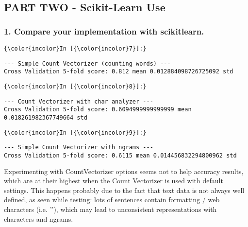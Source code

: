 \documentclass[11pt]{article}
\begin{document}
    \subsection{PART TWO - Scikit-Learn
Use}\label{part-two---scikit-learn-use}

\subsubsection{1. Compare your implementation with
scikitlearn.}\label{compare-your-implementation-with-scikitlearn.}

    \begin{Verbatim}[commandchars=\\\{\}]
{\color{incolor}In [{\color{incolor}7}]:} 
\end{Verbatim}


    \begin{Verbatim}[commandchars=\\\{\}]
--- Simple Count Vectorizer (counting words) ---
Cross Validation 5-fold score: 0.812 mean 0.012884098726725092 std 

    \end{Verbatim}

    \begin{Verbatim}[commandchars=\\\{\}]
{\color{incolor}In [{\color{incolor}8}]:} 
\end{Verbatim}


    \begin{Verbatim}[commandchars=\\\{\}]
--- Count Vectorizer with char analyzer ---
Cross Validation 5-fold score: 0.6094999999999999 mean 0.018261982367749664 std 

    \end{Verbatim}

    \begin{Verbatim}[commandchars=\\\{\}]
{\color{incolor}In [{\color{incolor}9}]:} 
\end{Verbatim}


    \begin{Verbatim}[commandchars=\\\{\}]
--- Simple Count Vectorizer with ngrams ---
Cross Validation 5-fold score: 0.6115 mean 0.014456832294800962 std 

    \end{Verbatim}

    Experimenting with CountVectorizer options seems not to help accuracy
results, which are at their highest when the Count Vectorizer is used
with default settings. This happens probably due to the fact that text
data is not always well defined, as seen while testing: lots of
sentences contain formatting / web characters (i.e. '\n'), which may
lead to unconsistent representations with characters and ngrams.
\end{document}
